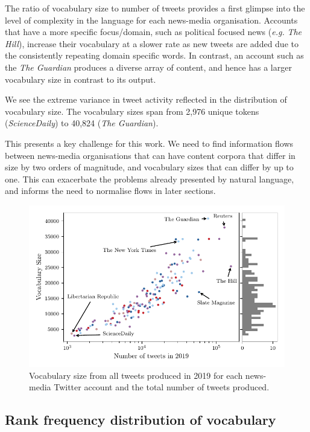 The ratio of vocabulary size to number of tweets provides a first glimpse into the level of complexity in the language for each news-media organisation. Accounts that have a more specific focus/domain, such as political focused news (\emph{e.g.} \emph{The Hill}), increase their vocabulary at a slower rate as new tweets are added due to the consistently repeating domain specific words. In contrast, an account such as the \emph{The Guardian} produces a diverse array of content, and hence has a larger vocabulary size in contrast to its output.

We see the extreme variance in tweet activity reflected in the distribution of vocabulary size. The vocabulary sizes span from 2,976 unique tokens (\emph{ScienceDaily}) to 40,824 (\emph{The Guardian}). 

This presents a key challenge for this work. We need to find information flows between news-media organisations that can have content corpora that differ in size by two orders of magnitude, and vocabulary sizes that can differ by up to one. This can exacerbate the problems already presented by natural language, and informs the need to normalise flows in later sections.


\begin{figure}[!htbp]
\centering
\includegraphics{chapter1/figs/vocab_vs_activity.pdf}
\caption{Vocabulary size from all tweets produced in 2019 for each news-media Twitter account and the total number of tweets produced.}\label{fig:data_vocabvsactivity}
\end{figure}

\subsection{Rank frequency distribution of vocabulary}\label{sec:zipf_fit}

